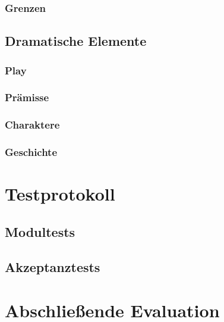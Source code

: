 \documentclass{Ausarbeitung}
\begin{document}
		\subsubsection{Grenzen}
	\subsection{Dramatische Elemente}
	\label{dramElemente}
		\subsubsection{Play}
		\subsubsection{Prämisse}
		\subsubsection{Charaktere}
		\subsubsection{Geschichte}
\clearpage
\section{Testprotokoll}
\label{test}
	\subsection{Modultests}
	\label{modultest}
	\subsection{Akzeptanztests}
	\label{akzeptanztest}
\clearpage
\section{Abschließende Evaluation}
\label{Evaluation}


\vfill %
\printbibliography
\end{document}
